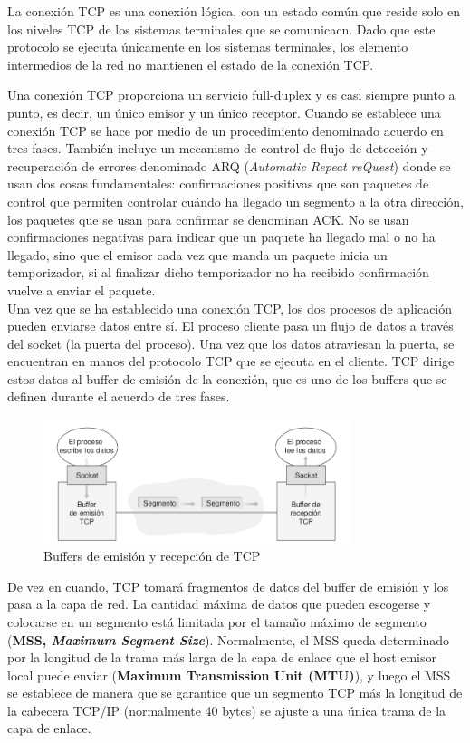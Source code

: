 \documentclass[a4paper,11pt]{article}
\begin{document}
La conexión TCP es una conexión lógica, con un estado común que reside solo en los niveles TCP de los sistemas terminales que se comunicacn. Dado que este protocolo se ejecuta únicamente en los sistemas terminales, los elemento intermedios de la red no mantienen el estado de la conexión TCP.

Una conexión TCP proporciona un servicio full-duplex y es casi siempre punto a punto, es decir, un único emisor y un único receptor. Cuando se establece una conexión TCP se hace por medio de un procedimiento denominado acuerdo en tres fases. También incluye un mecanismo de control de flujo de detección y recuperación de errores denominado ARQ (\textit{Automatic Repeat reQuest}) donde se usan dos cosas fundamentales: confirmaciones positivas que son paquetes de control que permiten controlar cuándo  ha llegado un segmento a la otra dirección, los paquetes que se usan para confirmar se denominan ACK. No se usan confirmaciones negativas para indicar que un paquete ha llegado mal o no ha llegado, sino que el emisor cada vez que manda un paquete inicia un temporizador, si al finalizar dicho temporizador no ha recibido confirmación vuelve a enviar el paquete. \\

Una vez que se ha establecido una conexión TCP, los dos procesos de aplicación pueden enviarse datos entre sí. El proceso cliente pasa un flujo de datos a través del socket (la puerta del proceso). Una vez que los datos atraviesan la puerta, se encuentran en manos del protocolo TCP que se ejecuta en el cliente. TCP dirige estos datos al buffer de emisión de la conexión, que es uno de los buffers que se definen durante el acuerdo de tres fases.

\begin{figure}[h]
\centering
\caption{Buffers de emisión y recepción de TCP}
\includegraphics[scale=1,width=0.8\textwidth]{buffer_emision.png}
\end{figure}

De vez en cuando, TCP tomará fragmentos de datos del buffer de emisión y los pasa a la capa de red. La cantidad máxima de datos que pueden escogerse y colocarse en un segmento está limitada por el tamaño máximo de segmento (\textbf{MSS, \textit{Maximum Segment Size}}). Normalmente, el MSS queda determinado por la longitud de la trama más larga de la capa de enlace que el host emisor local puede enviar (\textbf{Maximum Transmission Unit (MTU)}), y luego el MSS se establece de manera que se garantice que un segmento TCP más la longitud de la cabecera TCP/IP (normalmente 40 bytes) se ajuste a una única trama de la capa de enlace. \\
\end{document}
